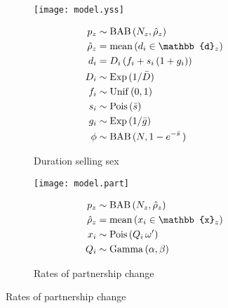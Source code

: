 \begin{figure}
  \begin{subfigure}{\textwidth}
    \begin{minipage}{.5\textwidth}
      \centering\texttt{[image: model.yss]}
    \end{minipage}
    \begin{minipage}{.5\textwidth}
      \begin{subequations}
      \begin{align}
           p_z &\sim \distr{BAB}{N_z, \hat{\rho}_z} \\
  \hat{\rho}_z &=    \distr{mean}{d_i \in \mathbb{d}_z} \\
           d_i &=    D_i\,(f_i + s_i\,(1 + g_i)) \\
           D_i &\sim \distr{Exp}{1/\bar{D}} \\
           f_i &\sim \distr{Unif}{0,1} \\
           s_i &\sim \distr{Pois}{\bar{s}} \\
           g_i &\sim \distr{Exp}{1/\bar{g}} \\
          \phi &\sim \distr{BAB}{N, 1-e^{-\bar{s}}\,}
      \end{align}
      \end{subequations}
    \end{minipage}
    \caption{Duration selling sex}
    \label{fig:model.yss}
  \end{subfigure}
  \begin{subfigure}{\textwidth}
    \begin{minipage}{.5\textwidth}
      \centering\texttt{[image: model.part]}
    \end{minipage}
    \begin{minipage}{.5\textwidth}
      \begin{subequations}
      \begin{align}
           p_z &\sim \distr{BAB}{N_z, \hat{\rho}_z} \\
  \hat{\rho}_z &=    \distr{mean}{x_i \in \mathbb{x}_z} \\
           x_i &\sim \distr{Pois}{Q_i\,\omega'} \\
           Q_i &\sim \distr{Gamma}{\alpha,\beta}
      \end{align}
      \end{subequations}
    \end{minipage}
    \caption{Rates of partnership change}
    \label{fig:model.part}
  \end{subfigure}

\end{figure}
